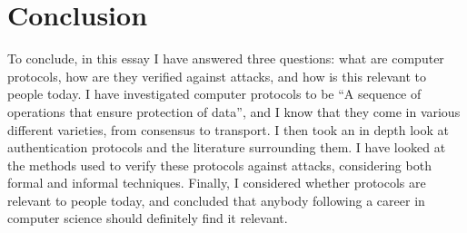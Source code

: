 \documentclass{article}
\begin{document}
\section{Conclusion}
To conclude, in this essay I have answered three questions: what are computer
protocols, how are they verified against attacks, and how is this relevant to
people today. I have investigated computer protocols to be “A sequence of
operations that ensure protection of data”, and I know that they come in various
different varieties, from consensus to transport. I then took an in depth look
at authentication protocols and the literature surrounding them. I have looked
at the methods used to verify these protocols against attacks, considering both
formal and informal techniques. Finally, I considered whether protocols are
relevant to people today, and concluded that anybody following a career in
computer science should definitely find it relevant.

\addtocounter{section}{1}



\nocite{*}
\end{document}
